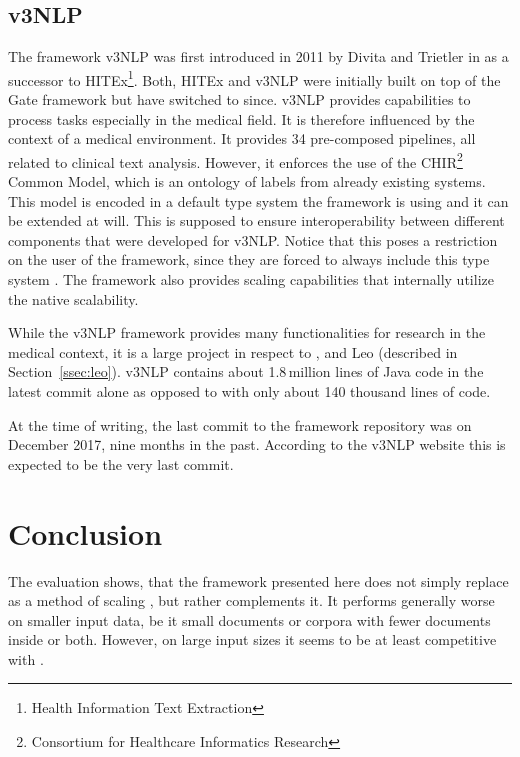 \subsection{v3NLP}
The framework v3NLP was first introduced in 2011 by Divita and Trietler in \cite{divita2011finding} as a successor to HITEx\footnote{Health Information Text Extraction}. Both, HITEx and v3NLP were initially built on top of the Gate framework but have switched to \uima{} since. v3NLP provides capabilities to process \nlp{} tasks especially in the medical field. It is therefore influenced by the context of a medical environment. It provides 34 pre-composed pipelines, all related to clinical text analysis. However, it enforces the use of the CHIR\footnote{Consortium for Healthcare Informatics Research} Common Model, which is an ontology of labels from already existing \nlp{} systems. This model is encoded in a default type system the framework is using and it can be extended at will. This is supposed to ensure interoperability between different \nlp{} components that were developed for v3NLP. Notice that this poses a restriction on the user of the framework, since they are forced to always include this type system \cite{divita2016v3nlp}. The framework also provides scaling capabilities that internally utilize the native \uimaas{} scalability.

While the v3NLP framework provides many functionalities for \nlp{} research in the medical context, it is a large project in respect to \uima{}, \uimaas{} and Leo (described in Section~\ref{ssec:leo}). v3NLP contains about 1.8\,million lines of Java code in the latest commit alone as opposed to \uimaas{} with only about 140 thousand lines of code. 

At the time of writing, the last commit to the framework repository was on December 2017, nine months in the past. According to the v3NLP website this is expected to be the very last commit.




\section{Conclusion}
The evaluation shows, that the framework presented here does not simply replace \uimaas{} as a method of scaling \uima{}, but rather complements it. It performs generally worse on smaller input data, be it small documents or corpora with fewer documents inside or both. However, on large input sizes it seems to be at least competitive with \uimaas{}. 

